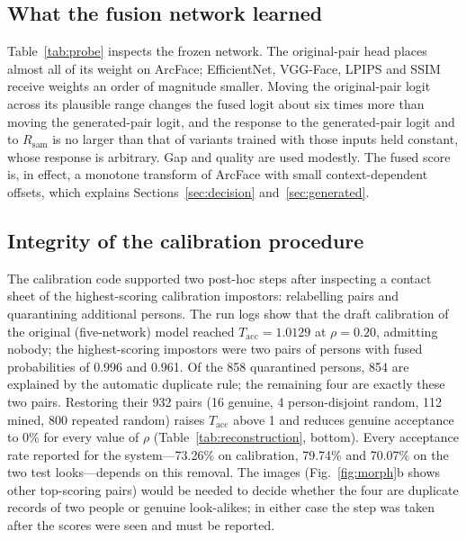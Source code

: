 \documentclass[journal]{IEEEtran}
\begin{document}
\subsection{What the fusion network learned}
\label{sec:probe}
Table~\ref{tab:probe} inspects the frozen network. The original-pair head places almost all of its weight on ArcFace; EfficientNet, VGG-Face, LPIPS and SSIM receive weights an order of magnitude smaller. Moving the original-pair logit across its plausible range changes the fused logit about six times more than moving the generated-pair logit, and the response to the generated-pair logit and to $R_\mathrm{sam}$ is no larger than that of variants trained with those inputs held constant, whose response is arbitrary. Gap and quality are used modestly. The fused score is, in effect, a monotone transform of ArcFace with small context-dependent offsets, which explains Sections~\ref{sec:decision} and~\ref{sec:generated}.



\subsection{Integrity of the calibration procedure}
\label{sec:integrity}
The calibration code supported two post-hoc steps after inspecting a contact sheet of the highest-scoring calibration impostors: relabelling pairs and quarantining additional persons. The run logs show that the draft calibration of the original (five-network) model reached $T_\mathrm{acc}=1.0129$ at $\rho=0.20$, admitting nobody; the highest-scoring impostors were two pairs of persons with fused probabilities of 0.996 and 0.961. Of the 858 quarantined persons, 854 are explained by the automatic duplicate rule; the remaining four are exactly these two pairs. Restoring their 932 pairs (16 genuine, 4 person-disjoint random, 112 mined, 800 repeated random) raises $T_\mathrm{acc}$ above 1 and reduces genuine acceptance to 0\% for every value of $\rho$ (Table~\ref{tab:reconstruction}, bottom). Every acceptance rate reported for the system---73.26\% on calibration, 79.74\% and 70.07\% on the two test looks---depends on this removal. The images (Fig.~\ref{fig:morph}b shows other top-scoring pairs) would be needed to decide whether the four are duplicate records of two people or genuine look-alikes; in either case the step was taken after the scores were seen and must be reported.
\end{document}
